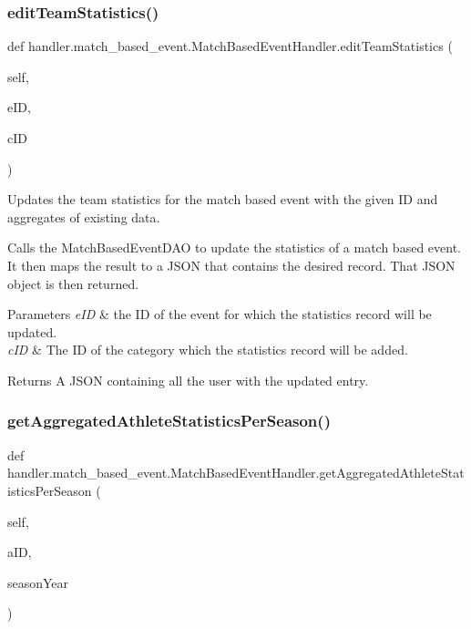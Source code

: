 \subsubsection{\texorpdfstring{edit\+Team\+Statistics()}{editTeamStatistics()}}
{\footnotesize\ttfamily def handler.\+match\+\_\+based\+\_\+event.\+Match\+Based\+Event\+Handler.\+edit\+Team\+Statistics (\begin{DoxyParamCaption}\item[{}]{self,  }\item[{}]{e\+ID,  }\item[{}]{c\+ID }\end{DoxyParamCaption})}



Updates the team statistics for the match based event with the given ID and aggregates of existing data. 

Calls the Match\+Based\+Event\+D\+AO to update the statistics of a match based event. It then maps the result to a J\+S\+ON that contains the desired record. That J\+S\+ON object is then returned.


\begin{DoxyParams}{Parameters}
{\em e\+ID} & the ID of the event for which the statistics record will be updated. \\
\hline
{\em c\+ID} & The ID of the category which the statistics record will be added.\\
\hline
\end{DoxyParams}
\begin{DoxyReturn}{Returns}
A J\+S\+ON containing all the user with the updated entry. 
\end{DoxyReturn}
\mbox{\label{classhandler_1_1match__based__event_1_1_match_based_event_handler_ac3a6e8ecaf44b7859f7190988faf836f}} 
\subsubsection{\texorpdfstring{get\+Aggregated\+Athlete\+Statistics\+Per\+Season()}{getAggregatedAthleteStatisticsPerSeason()}}
{\footnotesize\ttfamily def handler.\+match\+\_\+based\+\_\+event.\+Match\+Based\+Event\+Handler.\+get\+Aggregated\+Athlete\+Statistics\+Per\+Season (\begin{DoxyParamCaption}\item[{}]{self,  }\item[{}]{a\+ID,  }\item[{}]{season\+Year }\end{DoxyParamCaption})}



